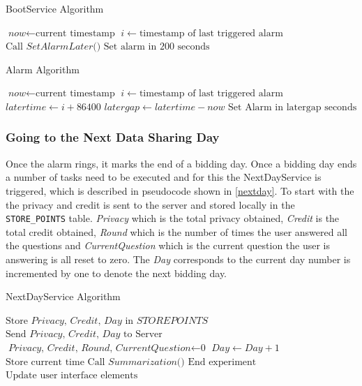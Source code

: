 \begin{algorithm}
\caption{BootService Algorithm}\label{boot}
\begin{algorithmic}[1]
\State $\textit{now} \gets \text{current timestamp}$
\State $i \gets \text{timestamp of last triggered alarm}$
  \State $\text{Call }\textit{SetAlarmLater()}$
\Else
  \State $\text{Set alarm in 200 seconds}$
\EndIf
\EndProcedure
\end{algorithmic}
\end{algorithm}


\begin{algorithm}
\caption{Alarm Algorithm}\label{setalarm}
\begin{algorithmic}[1]
\State $\textit{now} \gets \text{current timestamp}$
\State $i \gets \text{timestamp of last triggered alarm}$
\State $\textit{latertime} \gets \textit{i}+\text{86400}$
\State $\textit{latergap} \gets \textit{latertime}-\textit{now}$
\State $\text{Set Alarm in latergap seconds}$
\EndProcedure
\end{algorithmic}
\end{algorithm}

\subsubsection{Going to the Next Data Sharing Day} \label{next}
Once the alarm rings, it marks the end of a bidding day. Once a bidding day ends a number of tasks need to be executed
and for this the NextDayService is triggered, which is described in pseudocode shown in \ref{nextday}. To start with the the privacy and credit is sent to the server and stored locally in the \texttt{STORE\_POINTS} table. \textit{Privacy} which is the total privacy obtained, \textit{Credit} is the total credit obtained, \textit{Round} which is the number of times the user answered all the questions and \textit{CurrentQuestion} which is the current question the user is answering is all reset to zero. The \textit{Day} corresponds to the current day number is incremented by one to denote the next bidding day.

\begin{algorithm}
\caption{NextDayService Algorithm}\label{nextday}
\begin{algorithmic}[1]
\State $\text{Store }\textit{Privacy, Credit, Day } \text{in } \textit{STOREPOINTS}$
\State $\text{Send }\textit{Privacy, Credit, Day } \text{to Server}$
\State $\textit{Privacy, Credit, Round, CurrentQuestion} \gets \text{0}$
\State $\textit{Day} \gets \textit{Day}+1$
\State $\text{Store current time}$
\State $\text{Call }\textit{Summarization()}$
  \State $\text{End experiment}$
\Else
  \State $\text{Update user interface elements}$ 
\EndIf
\EndProcedure
\end{algorithmic}
\end{algorithm}

